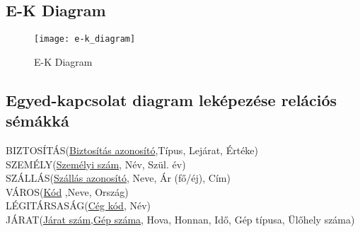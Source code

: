 \subsection{E-K Diagram}

\begin{figure}[!htb]

    \centering
    \texttt{[image: e-k\_diagram]}
    \caption{\label{fig:e-k_diagram}E-K Diagram}

\end{figure}
\pagebreak
\subsection{Egyed-kapcsolat diagram leképezése relációs sémákká}

    BIZTOSÍTÁS(\underline{Biztosítás azonosító},Típus, Lejárat, Értéke)\\
    SZEMÉLY(\underline{Személyi szám}, Név, Szül. év)\\
    SZÁLLÁS(\underline{Szállás azonosító}, Neve, Ár (fő/éj), Cím)\\
    VÁROS(\underline{Kód} ,Neve, Ország)\\
    LÉGITÁRSASÁG(\underline{Cég kód}, Név)\\
    JÁRAT(\underline{Járat szám},\underline{Gép száma}, Hova, Honnan, Idő, Gép típusa, Ülőhely száma)
